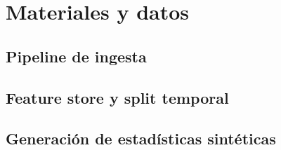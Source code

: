 \chapter{Materiales y datos}
\label{ch:materiales}

\section{Pipeline de ingesta}
\label{sec:pipeline}

\section{Feature store y split temporal}
\label{sec:feature-store}

\section{Generaci\'on de estad\'isticas sint\'eticas}
\label{sec:player-stats}
